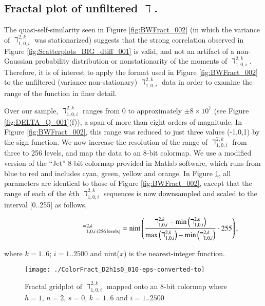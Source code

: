 \documentclass[12pt,longtitle,times]{amsart}
\begin{document}
\subsection[short]{Fractal plot of unfiltered $\daleth$.} The quasi-self-similarity seen in Figure \ref{fig:BWFract_002} (in which the variance of $\daleth_{1,0,i}^{2,k}$ was stationarized) suggests that the strong correlation observed in Figure \ref{fig:Scatterplots_BIG_dtiff_001} is valid, and not an artifact of a non-Gaussian probability distribution or nonstationarity of the moments of $\daleth_{1,0,i}^{2,k}$. Therefore, it is of interest to apply the format used in Figure \ref{fig:BWFract_002} to the unfiltered (variance non-stationary) $\daleth_{1,0,i}^{2,k}$ data in order to examine the range of the function in finer detail.

Over our sample, $\daleth_{1,0,i}^{2,k}$ ranges from 0 to approximately $\pm{}8\times{}10^7$ (see Figure \ref{fig:DELTA_Q_001}(f)), a span of more than eight orders of magnitude. In Figure \ref{fig:BWFract_002}, this range was reduced to just three values (-1,0,1) by the sign function. We now increase the resolution of the range of $\daleth_{1,0,i}^{2,k}$ from three to 256 levels, and map the data to an 8-bit colormap. We use a modified version of the ``Jet'' 8-bit colormap provided in Matlab\textsuperscript{\textregistered} software, which runs from blue to red and includes cyan, green, yellow and orange. In Figure \ref{fig:ColorFract_009}, all parameters are identical to those of Figure \ref{fig:BWFract_002}, except that the range of each of the $k$th $\daleth_{1,0,i}^{2,k}$ sequences is now downsampled and scaled to the interval [0..255] as follows,

\begin{equation}\label{Daleth 256}
\hphantom{---------}\nonumber\daleth_{1,0,i\text{ (256 levels)}}^{2,k}
=\text{nint}\left(\frac{\daleth_{1,0,i}^{2,k}-\text{min}\left(\daleth_{1,0,i}^{2,k}\right)}
{\text{max}\left(\daleth_{1,0,i}^{2,k}\right)-\text{min}\left(\daleth_{1,0,i}^{2,k}\right)}
\cdot{}255\right),
\end{equation}

where $k=1..6$; $i=1..2500$ and nint($x$) is the nearest-integer function.  

\begin{figure}[Ht]
\texttt{[image: ./ColorFract\_D2h1s0\_010-eps-converted-to]}
\caption{Fractal gridplot of $\daleth_{1,0,i}^{2,k}$ mapped onto an 8-bit colormap where $h=1$, $n=2$, $s=0$, $k=1..6$ and $i=1..2500$}
\label{fig:ColorFract_009}
\end{figure}
\end{document}

